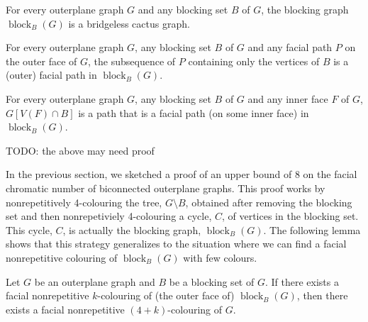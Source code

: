 \documentclass{patmorin}
\DeclareMathOperator{\block}{block}
\begin{document}
\begin{obs}
   For every outerplane graph $G$ and any blocking set $B$ of $G$,
   the blocking graph $\block_B(G)$ is a bridgeless cactus graph.
\end{obs}


\begin{obs}
For every outerplane graph $G$, any blocking set $B$ of $G$ and any
facial path $P$ on the outer face of  $G$, the subsequence of $P$
containing only the vertices of $B$ is a (outer) facial path in $\block_B(G)$.
\end{obs}



\begin{obs}
For every outerplane graph $G$, any blocking set $B$ of $G$ and any
inner face $F$ of $G$, $G[V(F)\cap B]$ is a path that is a facial path (on
some inner face)  in $\block_B(G)$.
\end{obs}

TODO: the above may need proof



In the previous section, we sketched a proof of an upper bound of
8 on the facial chromatic number of biconnected outerplane graphs.
This proof works by nonrepetitively 4-colouring the tree, $G\setminus B$, obtained after removing the blocking set and then nonrepetiviely
4-colouring a cycle, $C$, of vertices in the blocking set.  This cycle,
$C$, is actually the blocking graph, $\block_B(G)$.  The following lemma
shows that this strategy generalizes to the situation where we can find
a facial nonrepetitive colouring of $\block_B(G)$ with few colours.

\begin{lem}\label{lem:hitting_plus_four}
  Let $G$ be an outerplane graph and $B$ be a blocking set of $G$. If
  there exists a facial nonrepetitive $k$-colouring of (the outer 
  face of) $\block_{B}(G)$, then there exists a facial nonrepetitive
  $(4+k)$-colouring of $G$.
\end{lem}
\end{document}
